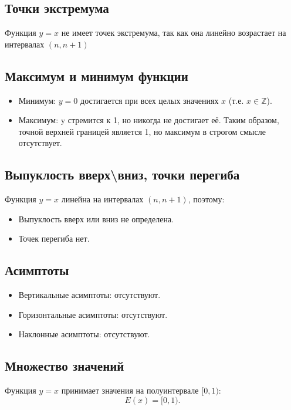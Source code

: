 \begin{flushleft}
		\subsection*{Точки экстремума}
		Функция $y={x}$ не имеет точек экстремума, так как она линейно возрастает на интервалах $(n,n+1)$
		
		\subsection*{Максимум и минимум функции}
		 
		\begin{itemize}
			\item Минимум: $y=0$ достигается при всех целых значениях $x$ (т.е. $x\in\mathds{Z}$).
			\item Максимум: y стремится к 1, но никогда не достигает её. Таким образом, точной верхней границей является 1, но максимум в строгом смысле отсутствует.
		\end{itemize}
		 
		\subsection*{Выпуклость вверх\textbackslash вниз, точки перегиба}
		Функция $y={x}$ линейна на интервалах $(n,n+1)$, поэтому:
		 
		\begin{itemize}
			\item Выпуклость вверх или вниз не определена.
			\item Точек перегиба нет.
		\end{itemize}
		 
		\subsection*{Асимптоты}
		 
		\begin{itemize}
			\item Вертикальные асимптоты: отсутствуют.
		 	
		 	\item Горизонтальные асимптоты: отсутствуют.
		 	
		 	\item Наклонные асимптоты: отсутствуют.
		\end{itemize}
		 
		\subsection*{Множество значений}
		 Функция $y={x}$ принимает значения на полуинтервале $[0,1)$:
		 \[E(x)=[0,1).\]
		 

\end{flushleft}
